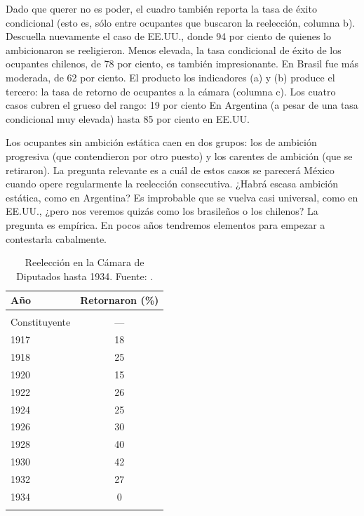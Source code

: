 \documentclass[letter,12pt]{article}
\begin{document}
Dado que querer no es poder, el cuadro también reporta la tasa de éxito condicional (esto es, sólo entre ocupantes que buscaron la reelección, columna b). Descuella nuevamente el caso de EE.UU., donde 94 por ciento de quienes lo ambicionaron se reeligieron. Menos elevada, la tasa condicional de éxito de los ocupantes chilenos, de 78 por ciento, es también impresionante. En Brasil fue más moderada, de 62 por ciento. El producto los indicadores (a) y (b) produce el tercero: la tasa de retorno de ocupantes a la cámara (columna c). Los cuatro casos cubren el grueso del rango: 19 por ciento En Argentina (a pesar de una tasa condicional muy elevada) hasta 85 por ciento en EE.UU. 

Los ocupantes sin ambición estática caen en dos grupos: los de ambición progresiva (que contendieron por otro puesto) y los carentes de ambición (que se retiraron). La pregunta relevante es a cuál de estos casos se parecerá México cuando opere regularmente la reelección consecutiva. ¿Habrá escasa ambición estática, como en Argentina? Es improbable que se vuelva casi universal, como en EE.UU., ¿pero nos veremos quizás como los brasileños o los chilenos? La pregunta es empírica. En pocos años tendremos elementos para empezar a contestarla cabalmente.

\begin{table}
  \centering
  \begin{tabular}{lc}
    Año &  Retornaron (\%) \\ \hline \\ [-1.25ex]
    Constituyente &          --- \\
    1917 &           18 \\
    1918 &           25 \\
    1920 &           15 \\
    1922 &           26 \\
    1924 &           25 \\
    1926 &           30 \\
    1928 &           40 \\
    1930 &           42 \\
    1932 &           27 \\
    1934 &            0 \\ [-1.25ex] \\ \hline
  \end{tabular}
  \caption{Reelección en la Cámara de Diputados hasta 1934. Fuente: \citet{godoy.reeleccion.2014}.}\label{T:1920s}
\end{table}
\end{document}
